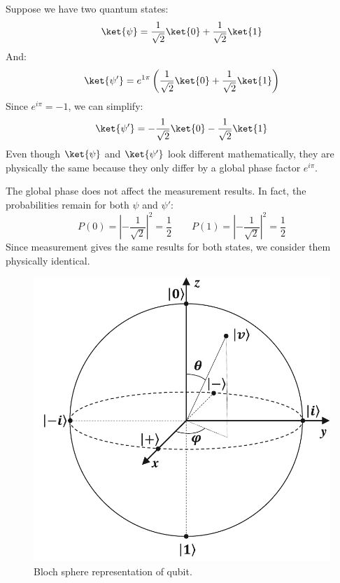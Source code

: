 \begin{examplebox}
    Suppose we have two quantum states:
    \begin{equation*}
        \ket{\psi} = \dfrac{1}{\sqrt{2}}\ket{0} + \dfrac{1}{\sqrt{2}}\ket{1}
    \end{equation*}
    And:
    \begin{equation*}
        \ket{\psi'} = e^{1\pi} \left(\dfrac{1}{\sqrt{2}}\ket{0} + \dfrac{1}{\sqrt{2}}\ket{1}\right)
    \end{equation*}
    Since $e^{i\pi} = -1$, we can simplify:
    \begin{equation*}
        \ket{\psi'} = -\dfrac{1}{\sqrt{2}}\ket{0} -\dfrac{1}{\sqrt{2}}\ket{1}
    \end{equation*}
    Even though $\ket{\psi}$ and $\ket{\psi'}$ look different mathematically, they are physically the same because they only differ by a global phase factor $e^{i\pi}$.

    The global phase does not affect the measurement results. In fact, the probabilities remain for both $\psi$ and $\psi'$:
    \begin{equation*}
        P\left(0\right) = \left|-\dfrac{1}{\sqrt{2}}\right|^{2} = \dfrac{1}{2}
        \hspace{2em}
        P\left(1\right) = \left|-\dfrac{1}{\sqrt{2}}\right|^{2} = \dfrac{1}{2}
    \end{equation*}
    Since measurement gives the same results for both states, we consider them physically identical.
\end{examplebox}

\begin{figure}[!htp]
    \centering
    \includegraphics[width=.7\textwidth]{img/bloch-sphere-qubit-1.pdf}
    \caption{Bloch sphere representation of qubit.}
    \label{fig: Bloch sphere representation of qubit}
\end{figure}